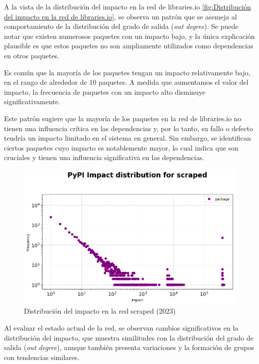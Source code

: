 A la vista de la distribución del impacto en la red de libraries.io \ref{fig:Distribución del impacto en la red de libraries.io}, se observa un patrón que se
asemeja al comportamiento de la distribución del grado de salida (\textit{out degree}). Se puede notar
que existen numerosos paquetes con un impacto bajo, y la única explicación plausible es que estos paquetes
no son ampliamente utilizados como dependencias en otros paquetes.

Es común que la mayoría de los paquetes tengan un impacto relativamente bajo, en el rango de alrededor
de 10 paquetes. A medida que aumentamos el valor del impacto, la frecuencia de paquetes con un impacto
alto disminuye significativamente.

Este patrón sugiere que la mayoría de los paquetes en la red de libraries.io no tienen una influencia
crítica en las dependencias y, por lo tanto, su fallo o defecto tendría un impacto limitado en el
sistema en general. Sin embargo, se
identifican ciertos paquetes cuyo impacto es notablemente mayor, lo cual indica que son cruciales
y tienen una influencia significativa en las dependencias.

\begin{figure}[h!]
    \begin{center}
        \includegraphics[width=1\textwidth]{img/pypi/scraped_impact_distribution.png}
        \caption{Distribución del impacto en la red scraped (2023)}
        \label{fig:Distribución del impacto en la red scraped}
    \end{center}
\end{figure}

Al evaluar el estado actual de la red, se observan cambios significativos en la distribución del
impacto, que muestra similitudes con la distribución del grado de salida (\textit{out degree}),
aunque también presenta variaciones y la formación de grupos con tendencias similares.


